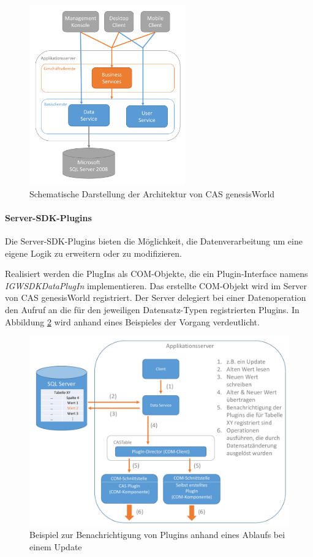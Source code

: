 \begin{figure}[H]
	\centering
  \includegraphics[width=0.6\textwidth, width=0.6\textwidth]{pics/GenesisWorld_Architektur.pdf}
	\caption{Schematische Darstellung der Architektur von CAS genesisWorld}
	\label{gw_Architektur}
\end{figure}

\paragraph{Server-SDK-Plugins}

Die Server-SDK-Plugins bieten die Möglichkeit, die Datenverarbeitung um eine eigene Logik zu erweitern oder zu modifizieren. 

Realisiert werden die PlugIns als COM-Objekte, die ein Plugin-Interface namens \textit{IGWSDKDataPlugIn} implementieren. Das erstellte COM-Objekt wird im Server von CAS genesisWorld registriert. Der Server delegiert bei einer Datenoperation den Aufruf an die für den jeweiligen Datensatz-Typen registrierten Plugins. In Abbildung \ref{gw_plugin} wird anhand eines Beispieles der Vorgang verdeutlicht.

\begin{figure}[H]
	\centering
  \includegraphics[width=1.0\textwidth, width=1.0\textwidth]{pics/analyse_plugins.pdf}
	\caption{Beispiel zur Benachrichtigung von Plugins anhand eines Ablaufs bei einem Update}
	\label{gw_plugin}
\end{figure}

